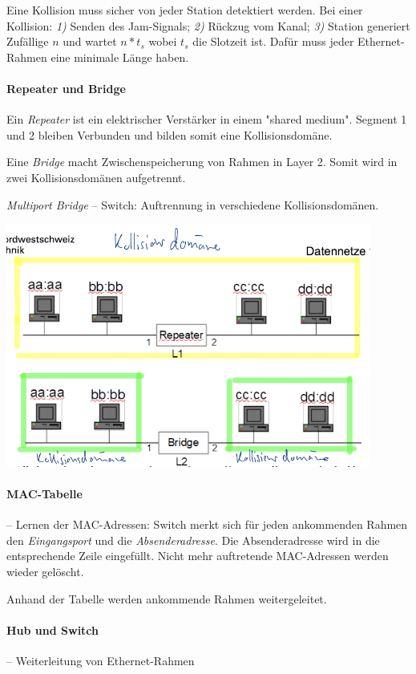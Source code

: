 \documentclass[a4paper,12pt]{article}
\begin{document}
Eine Kollision muss sicher von jeder Station detektiert werden. Bei einer Kollision: \emph{1)} Senden des Jam-Signals; \emph{2)} Rückzug vom Kanal; \emph{3)} Station generiert Zufällige $n$ und wartet $n*t_s$ wobei $t_s$ die Slotzeit ist.
Dafür muss jeder Ethernet-Rahmen eine minimale Länge haben.

\paragraph{Repeater und Bridge}
Ein \emph{Repeater} ist ein elektrischer Verstärker in einem "shared medium". Segment 1 und 2 bleiben Verbunden und bilden somit eine Kollisionsdomäne.

Eine \emph{Bridge} macht Zwischenspeicherung von Rahmen in Layer 2. Somit wird in zwei Kollisionsdomänen aufgetrennt.

\emph{Multiport Bridge} -- Switch: Auftrennung in verschiedene Kollisionsdomänen.


\begin{center}
\includegraphics[width=12cm]{img/05_Bridge.png}
\end{center}


\paragraph{MAC-Tabelle} -- Lernen der MAC-Adressen: Switch merkt sich für jeden ankommenden Rahmen den \emph{Eingangsport} und die \emph{Absenderadresse}. Die Absenderadresse wird in die entsprechende Zeile eingefüllt.
Nicht mehr auftretende MAC-Adressen werden wieder gelöscht.

Anhand der Tabelle werden ankommende Rahmen weitergeleitet.

\paragraph{Hub und Switch} -- Weiterleitung von Ethernet-Rahmen
\end{document}
